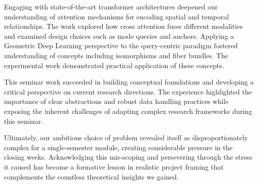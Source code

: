 Engaging with state-of-the-art transformer architectures deepened our understanding of attention mechanisms for encoding spatial and temporal relationships. The work explored how cross attention fuses different modalities and examined design choices such as mode queries and anchors. Applying a Geometric Deep Learning perspective to the query-centric paradigm fostered understanding of concepts including isomorphisms and fiber bundles. The experimental work demonstrated practical application of these concepts.

This seminar work succeeded in building conceptual foundations and developing a critical perspective on current research directions. The experience highlighted the importance of clear abstractions and robust data handling practices while exposing the inherent challenges of adapting complex research frameworks during this seminar.

Ultimately, our ambitious choice of problem revealed itself as disproportionately complex for a single-semester module, creating considerable pressure in the closing weeks. Acknowledging this mis-scoping and persevering through the stress it caused has become a formative lesson in realistic project framing that complements the countless theoretical insights we gained.

\newpage